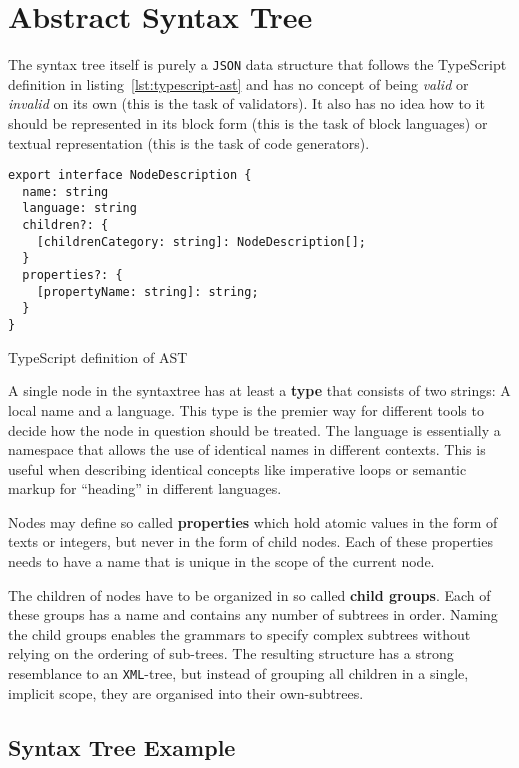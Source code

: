 \documentclass[sigconf,review=true]{acmart}
\begin{document}
\section{Abstract Syntax Tree}

The syntax tree itself is purely a \texttt{JSON} data structure that follows the TypeScript definition in listing~\ref{lst:typescript-ast} and has no concept of being \textit{valid} or \textit{invalid} on its own (this is the task of validators). It also has no idea how to it should be represented in its block form (this is the task of block languages) or textual representation (this is the task of code generators).

\begin{listing}[H]
\begin{verbatim}
export interface NodeDescription {
  name: string
  language: string
  children?: {
    [childrenCategory: string]: NodeDescription[];
  }
  properties?: {
    [propertyName: string]: string;
  }
}
\end{verbatim}
\caption{TypeScript definition of AST}
\label{lst:typescript-ast}
\end{listing}

A single node in the syntaxtree has at least a \textbf{type} that consists of two strings: A local name and a language. This type is the premier way for different tools to decide how the node in question should be treated. The language is essentially a namespace that allows the use of identical names in different contexts. This is useful when describing identical concepts like imperative loops or semantic markup for \enquote{heading} in different languages.

Nodes may define so called \textbf{properties} which hold atomic values in the form of texts or integers, but never in the form of child nodes. Each of these properties needs to have a name that is unique in the scope of the current node.

The children of nodes have to be organized in so called \textbf{child groups}. Each of these groups has a name and contains any number of subtrees in order. Naming the child groups enables the grammars to specify complex subtrees without relying on the ordering of sub-trees. The resulting structure has a strong resemblance to an \texttt{XML}-tree, but instead of grouping all children in a single, implicit scope, they are organised into their own-subtrees.

\subsection{Syntax Tree Example}
\end{document}
